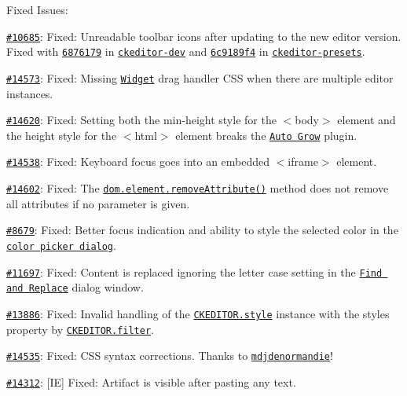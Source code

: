 Fixed Issues\+:


\begin{DoxyItemize}
\item \href{http://dev.ckeditor.com/ticket/10685}{\tt \#10685}\+: Fixed\+: Unreadable toolbar icons after updating to the new editor version. Fixed with \href{https://github.com/ckeditor/ckeditor-dev/commit/6876179db4ee97e786b07b8fd72e6b4120732185}{\tt 6876179} in \href{https://github.com/ckeditor/ckeditor-dev}{\tt ckeditor-\/dev} and \href{https://github.com/ckeditor/ckeditor-presets/commit/6c9189f46392d2c126854fe8889b820b8c76d291}{\tt 6c9189f4} in \href{https://github.com/ckeditor/ckeditor-presets}{\tt ckeditor-\/presets}.
\item \href{https://dev.ckeditor.com/ticket/14573}{\tt \#14573}\+: Fixed\+: Missing \href{http://ckeditor.com/addon/widget}{\tt Widget} drag handler C\+SS when there are multiple editor instances.
\item \href{https://dev.ckeditor.com/ticket/14620}{\tt \#14620}\+: Fixed\+: Setting both the {\ttfamily min-\/height} style for the {\ttfamily $<$body$>$} element and the {\ttfamily height} style for the {\ttfamily $<$html$>$} element breaks the \href{http://ckeditor.com/addon/autogrow}{\tt Auto Grow} plugin.
\item \href{http://dev.ckeditor.com/ticket/14538}{\tt \#14538}\+: Fixed\+: Keyboard focus goes into an embedded {\ttfamily $<$iframe$>$} element.
\item \href{http://dev.ckeditor.com/ticket/14602}{\tt \#14602}\+: Fixed\+: The \href{http://docs.ckeditor.com/#!/api/CKEDITOR.dom.element-method-removeAttribute}{\tt {\ttfamily dom.\+element.\+remove\+Attribute()}} method does not remove all attributes if no parameter is given.
\item \href{http://dev.ckeditor.com/ticket/8679}{\tt \#8679}\+: Fixed\+: Better focus indication and ability to style the selected color in the \href{http://ckeditor.com/addon/colordialog}{\tt color picker dialog}.
\item \href{http://dev.ckeditor.com/ticket/11697}{\tt \#11697}\+: Fixed\+: Content is replaced ignoring the letter case setting in the \href{http://ckeditor.com/addon/find}{\tt Find and Replace} dialog window.
\item \href{http://dev.ckeditor.com/ticket/13886}{\tt \#13886}\+: Fixed\+: Invalid handling of the \href{http://docs.ckeditor.com/#!/api/CKEDITOR.style}{\tt {\ttfamily C\+K\+E\+D\+I\+T\+O\+R.\+style}} instance with the {\ttfamily styles} property by \href{http://docs.ckeditor.com/#!/api/CKEDITOR.filter}{\tt {\ttfamily C\+K\+E\+D\+I\+T\+O\+R.\+filter}}.
\item \href{http://dev.ckeditor.com/ticket/14535}{\tt \#14535}\+: Fixed\+: C\+SS syntax corrections. Thanks to \href{https://github.com/mdjdenormandie}{\tt mdjdenormandie}!
\item \href{http://dev.ckeditor.com/ticket/14312}{\tt \#14312}\+: \mbox{[}IE\mbox{]} Fixed\+: Artifact is visible after pasting any text.
\end{DoxyItemize}

